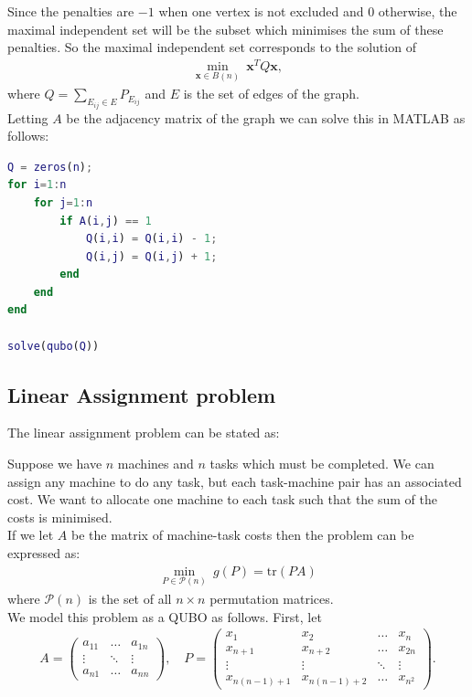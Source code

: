 \documentclass{article}
\begin{document}
\noindent Since the penalties are \(-1\) when one vertex is not excluded and 0 otherwise, the maximal independent set will be the subset which minimises the sum of these penalties. So the maximal independent set corresponds to the solution of
\begin{align*}
    \min_{\mathbf{x} \in B(n)} \: \mathbf{x}^T Q \mathbf{x},
\end{align*}
where \(Q = \sum_{E_{ij} \in E} P_{E_{ij}}\) and \(E\) is the set of edges of the graph.\\

\noindent Letting \(A\) be the adjacency matrix of the graph we can solve this in MATLAB as follows:
\begin{lstlisting}[language=MATLAB]
Q = zeros(n);
for i=1:n
    for j=1:n
        if A(i,j) == 1
            Q(i,i) = Q(i,i) - 1;
            Q(i,j) = Q(i,j) + 1;
        end
    end
end

solve(qubo(Q))
\end{lstlisting}

\subsection{Linear Assignment problem}

The linear assignment problem can be stated as:

Suppose we have \(n\) machines and \(n\) tasks which must be completed. We can assign any machine to do any task, but each task-machine pair has an associated cost. We want to allocate one machine to each task such that the sum of the costs is minimised. \\

\noindent If we let \(A\) be the matrix of machine-task costs then the problem can be expressed as: 
\begin{align*}
    \min_{P \in \mathcal{P}(n)} \: g(P) = \text{tr}(PA)
\end{align*}
where \(\mathcal{P}(n)\) is the set of all \(n \times n\) permutation matrices. \\

\noindent We model this problem as a QUBO as follows. First, let 
\begin{align*}
    A = \begin{pmatrix}
    a_{11} & \hdots & a_{1n} \\
    \vdots & \ddots & \vdots \\
    a_{n1} & \hdots & a_{nn}
\end{pmatrix}, \quad P = \begin{pmatrix}
    x_{1} & x_2 & \hdots & x_{n} \\
    x_{n + 1} & x_{n + 2} & \hdots & x_{2n} \\
    \vdots & \vdots & \ddots & \vdots \\
    x_{n(n-1)+1} & x_{n(n-1)+2} & \hdots & x_{n^2}
\end{pmatrix}.
\end{align*}
\end{document}
